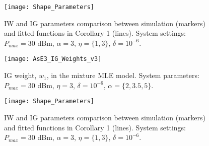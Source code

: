 \documentclass[12pt, draftclsnofoot, onecolumn]{IEEEtran}
\theoremstyle{plain}
\begin{document}
%
\begin{figure}[t]%
        \centering
        \texttt{[image: Shape\_Parameters]}
        \vspace{-0.16in}
        \caption{{IW and IG parameters comparison between simulation (markers) and fitted functions in Corollary 1 (lines).  System settings: $P_{max}=30$ dBm, $\alpha=3$, $\eta=\{1, 3\}$, $\delta=10^{-6}$.}} \label{IWsAE}
        \vspace{-.45in}
\end{figure}%
\fi
\begin{figure*}
\centering
\begin{minipage}[b]{.5\textwidth}
\centering
        \texttt{[image: AsE3\_IG\_Weights\_v3]}
        \vspace{-0.25in}
        \caption{{\small IG weight, $w_1$, in the mixture MLE model. System parameters: $P_{max}=30$ dBm, $\eta=3$, $\delta=10^{-6}$, $\alpha=\{2, 3.5, 5\}$.\\}} 
        \label{IGwAE13}
\end{minipage}\quad
\begin{minipage}[b]{.47\textwidth}
\centering
        \texttt{[image: Shape\_Parameters]}
        \vspace{-0.25in}
        \caption{{\small IW and IG parameters comparison between simulation (markers) and fitted functions in Corollary 1 (lines).  System settings: $P_{max}=30$ dBm, $\alpha=3$, $\eta=\{1, 3\}$, $\delta=10^{-6}$.}} \label{IWsAE}
\end{minipage}\vspace{-0.48in}\vspace{-.15in}\vspace{-.1in}
\end{figure*}
\vspace{-.2in}
\end{document}
